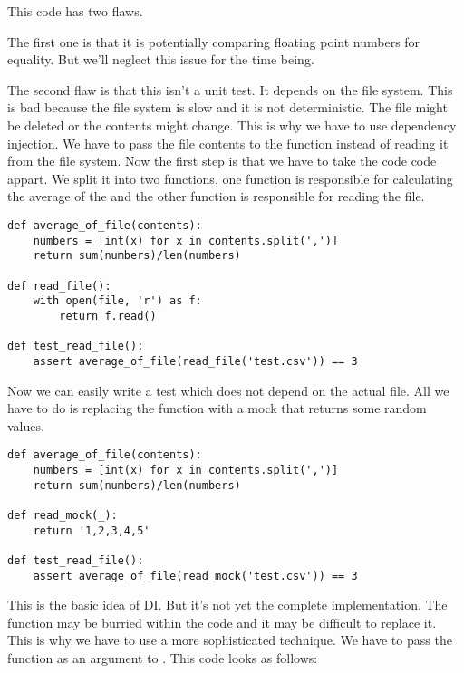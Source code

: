 This code has two flaws. 

The first one is that it is potentially comparing floating point numbers for equality. But we'll neglect this issue for the time being.

The second flaw is that this isn't a unit test. It depends on the file system. This is bad because the file system is slow and it is not deterministic. The file might be deleted or the contents might change. This is why we have to use dependency injection. We have to pass the file contents to the function instead of reading it from the file system. Now the first step is that we have to take the code code appart. We split it into two functions, one function is responsible for calculating the average of the  and the other function is responsible for reading the file.

\begin{programcode}{}
\begin{verbatim}
def average_of_file(contents):
    numbers = [int(x) for x in contents.split(',')]
    return sum(numbers)/len(numbers)

def read_file():
    with open(file, 'r') as f:
        return f.read()

def test_read_file():
    assert average_of_file(read_file('test.csv')) == 3
\end{verbatim}
\end{programcode}

Now we can easily write a test which does not depend on the actual file. All we have to do is replacing the  function with a mock that returns some random values.

\begin{programcode}{}
\begin{verbatim}
def average_of_file(contents):
    numbers = [int(x) for x in contents.split(',')]
    return sum(numbers)/len(numbers)

def read_mock(_):
    return '1,2,3,4,5'

def test_read_file():
    assert average_of_file(read_mock('test.csv')) == 3
\end{verbatim}
\end{programcode}

This is the basic idea of DI. But it's not yet the complete implementation. The  function may be burried within the code and it may be difficult to replace it. This is why we have to use a more sophisticated technique. We have to pass the function as an argument to . This code looks as follows:

